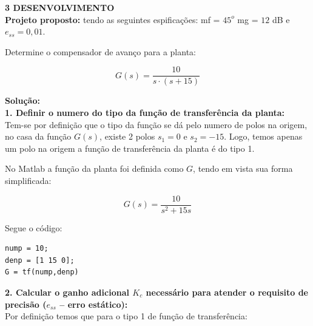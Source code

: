 \noindent \textcolor{myBlue}{\textbf{\large{3 DESENVOLVIMENTO }}}\\

\noindent \textbf{Projeto proposto:} tendo as seguintes espificações: mf = $45^o$ mg = $12$ dB e $e_{ss} = 0,01$. 

\begin{figure}[H]
\centering
{}
\end{figure}

\noindent Determine o compensador de avanço para a planta:

\[ G(s) = \dfrac{10}{s\cdot (s+15)}\]

\noindent \textbf{Solução:} \\

\noindent \textbf{1. Definir o numero do tipo da função de transferência da planta:} \\

Tem-se por definição que o tipo da função se dá pelo numero de polos na origem, no casa da função $G(s)$, existe 2 polos $s_1 = 0$ e $s_2 = -15$. Logo, temos apenas um polo na origem {\color{red}a função de transferência da planta é do tipo 1}.

No Matlab a função da planta foi definida como $G$, tendo em vista sua forma simplificada:

\[G(s) = \dfrac{10}{s^2 + 15s}\]

\noindent Segue o código: 

\begin{lstlisting}[style=matlab]
nump = 10;
denp = [1 15 0];
G = tf(nump,denp)
\end{lstlisting}\vspace{0.2cm}



\noindent \textbf{2. Calcular o ganho adicional $K_c$ necessário para atender o requisito de precisão ($e_{ss}$ – erro estático):} \\

Por definição temos que para o tipo 1 de função de transferência:

